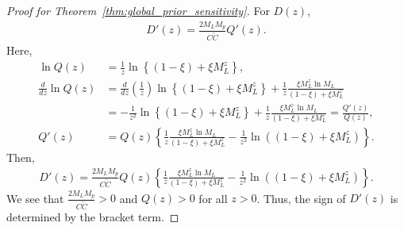 \documentclass[12pt]{article}
\begin{document}
\begin{proof}[Proof for Theorem~\ref{thm:global_prior_sensitivity}]
    For $D(z)$,
    \begin{align*}
        D'(z) = \frac{2M_L M_p}{C\tilde{C}}Q'(z).
    \end{align*}
    Here,
    \begin{align*}
        \ln Q(z) &= \frac{1}{z}\ln\left\{(1 - \xi) + \xi M_L^z\right\}, \\
        \frac{d}{dz} \ln Q(z) &= \frac{d}{dz}\left(\frac{1}{z}\right)\ln\left\{(1 - \xi) + \xi M_L^z \right\} + \frac{1}{z}\frac{\xi M_L^z \ln M_L}{(1 - \xi) + \xi M_L^z} \\
        &= -\frac{1}{z^2}\ln\left\{(1 - \xi) + \xi M_L^z \right\} + \frac{1}{z}\frac{\xi M_L^z \ln M_L}{(1 - \xi) + \xi M_L^z} = \frac{Q'(z)}{Q(z)}, \\
        Q'(z) &= Q(z)\left\{\frac{1}{z}\frac{\xi M_L^z \ln M_L}{(1 - \xi) + \xi M_L^z} - \frac{1}{z^2}\ln\left((1 - \xi) + \xi M_L^z \right)\right\}.
    \end{align*}
    Then,
    \begin{align*}
        D'(z) = \frac{2M_L M_p}{C\tilde{C}} Q(z) \left\{\frac{1}{z}\frac{\xi M_L^z \ln M_L}{(1 - \xi) + \xi M_L^z} - \frac{1}{z^2}\ln\left((1 - \xi) + \xi M_L^z \right)\right\}.
    \end{align*}
    We see that $\frac{2M_L M_p}{C\tilde{C}} > 0$ and $Q(z) > 0$ for all $z > 0$.
    Thus, the sign of $D'(z)$ is determined by the bracket term.


\end{proof}
\end{document}
